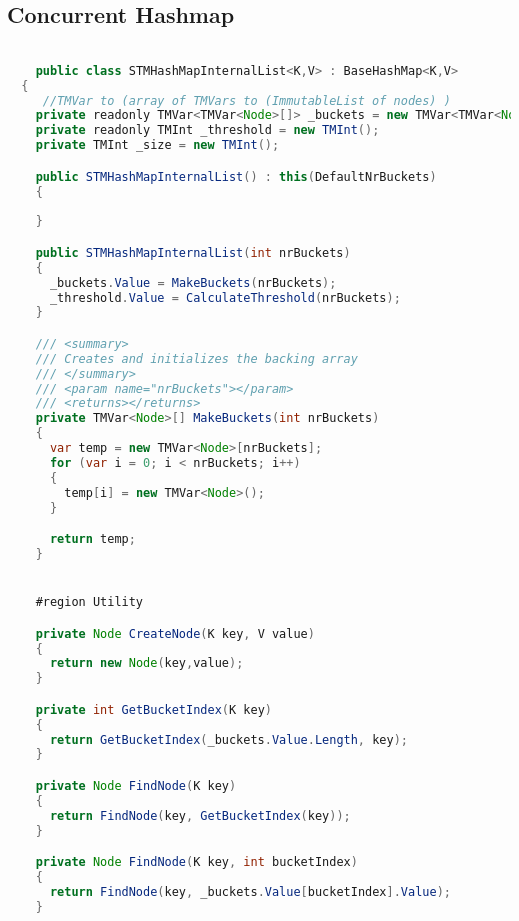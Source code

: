 \subsection{Concurrent Hashmap}
\begin{lstlisting}[label=lst:impl_hashmap_lib,
  caption={STM Library Based Concurrent Hashmap Implementation},
  language=Java,  
  showspaces=false,
  showtabs=false,
  breaklines=true,
  showstringspaces=false,
  breakatwhitespace=true,
  commentstyle=\color{greencomments},
  keywordstyle=\color{bluekeywords},
  stringstyle=\color{redstrings},
  escapechar=~,
  morekeywords={atomic, retry, orelse, var, get, set, ref, out, readonly, virtual, override, region, endregion, foreach, lock}]  % Start your code-block

    public class STMHashMapInternalList<K,V> : BaseHashMap<K,V>
  {
     //TMVar to (array of TMVars to (ImmutableList of nodes) )
    private readonly TMVar<TMVar<Node>[]> _buckets = new TMVar<TMVar<Node>[]>(); 
    private readonly TMInt _threshold = new TMInt();
    private TMInt _size = new TMInt();

    public STMHashMapInternalList() : this(DefaultNrBuckets)
    {
      
    }

    public STMHashMapInternalList(int nrBuckets)
    {
      _buckets.Value = MakeBuckets(nrBuckets);
      _threshold.Value = CalculateThreshold(nrBuckets);
    }

    /// <summary>
    /// Creates and initializes the backing array
    /// </summary>
    /// <param name="nrBuckets"></param>
    /// <returns></returns>
    private TMVar<Node>[] MakeBuckets(int nrBuckets)
    {
      var temp = new TMVar<Node>[nrBuckets];
      for (var i = 0; i < nrBuckets; i++)
      {
        temp[i] = new TMVar<Node>(); 
      }

      return temp;
    }


    #region Utility

    private Node CreateNode(K key, V value)
    {
      return new Node(key,value);
    }

    private int GetBucketIndex(K key)
    {
      return GetBucketIndex(_buckets.Value.Length, key);
    }

    private Node FindNode(K key)
    {
      return FindNode(key, GetBucketIndex(key));
    }

    private Node FindNode(K key, int bucketIndex)
    {
      return FindNode(key, _buckets.Value[bucketIndex].Value);
    }


\end{lstlisting}
